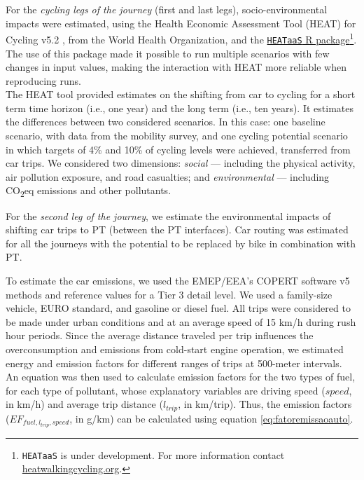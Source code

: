 \documentclass[review, doubleblind, 3p,
authoryear]{elsarticle} %
\begin{document}
For the \emph{cycling legs of the journey} (first and last legs),
socio-environmental impacts were estimated, using the Health Economic
Assessment Tool (HEAT) for Cycling v5.2 \citep{HEAT}, from the World
Health Organization, and the
\href{https://github.com/HEAT-WHO/HEAT_heatr_api}{\texttt{HEATaaS} R
package}\footnote{\texttt{HEATaaS} is under development. For more
  information contact
  \href{https://heatwalkingcycling.org}{heatwalkingcycling.org}.}. The
use of this package made it possible to run multiple scenarios with few
changes in input values, making the interaction with HEAT more reliable
when reproducing runs.\\
The HEAT tool provided estimates on the shifting from car to cycling for
a short term time horizon (i.e., one year) and the long term (i.e., ten
years). It estimates the differences between two considered scenarios.
In this case: one baseline scenario, with data from the mobility survey,
and one cycling potential scenario in which targets of 4\% and 10\% of
cycling levels were achieved, transferred from car trips. We considered
two dimensions: \emph{social} --- including the physical activity, air
pollution exposure, and road casualties; and \emph{environmental} ---
including CO\textsubscript{2}eq emissions and other pollutants.

For the \emph{second leg of the journey}, we estimate the environmental
impacts of shifting car trips to PT (between the PT interfaces). Car
routing was estimated for all the journeys with the potential to be
replaced by bike in combination with PT.

To estimate the car emissions, we used the EMEP/EEA's COPERT software v5
methods and reference values \citep{COPERT} for a Tier 3 detail level.
We used a family-size vehicle, EURO standard, and gasoline or diesel
fuel. All trips were considered to be made under urban conditions and at
an average speed of 15 km/h during rush hour periods. Since the average
distance traveled per trip influences the overconsumption and emissions
from cold-start engine operation, we estimated energy and emission
factors for different ranges of trips at 500-meter intervals.\\
An equation was then used to calculate emission factors for the two
types of fuel, for each type of pollutant, whose explanatory variables
are driving speed (\(speed\), in km/h) and average trip distance
(\(l_{trip}\), in km/trip). Thus, the emission factors
(\(EF_{fuel,l_{trip},speed}\), in g/km) can be calculated using equation
\ref{eq:fatoremissaoauto}.
\end{document}
